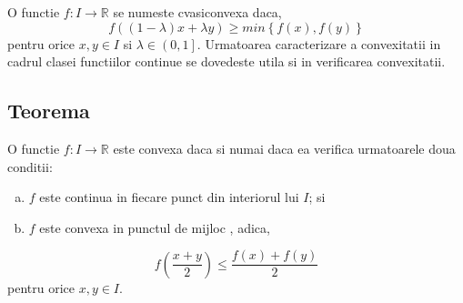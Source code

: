 \documentclass[a4paper,12pt,oneside]{report}
\begin{document}
O functie \(f: I \rightarrow \mathbb{R}\) se numeste cvasiconvexa daca,
 \begin{displaymath}
  f\left ( \left ( 1-\lambda  \right )x + \lambda y \right )\geq  min\left \{ f\left ( x \right ), f\left ( y \right ) \right \}
\end{displaymath}
pentru orice  \(x, y \in I\) si \(\lambda  \in \left ( 0,1 \right ]\).
	 Urmatoarea caracterizare a convexitatii in cadrul clasei functiilor continue se dovedeste utila si in verificarea convexitatii. 

\subsection{Teorema}
O functie \(f : I \rightarrow \mathbb{R}\) este convexa daca si numai daca ea verifica urmatoarele doua conditii:
\begin{enumerate}[a)]
\item \(f\) este continua in fiecare punct din interiorul lui \(I\); si
\item \(f\) este convexa in punctul de mijloc , adica, 
\end{enumerate}

\begin{displaymath}
  f\left ( \frac{x+y}{2} \right )\leq \frac{f\left ( x \right )+f\left ( y \right )}{2}
\end{displaymath}
pentru orice \(x, y \in I\). 
\end{document}
